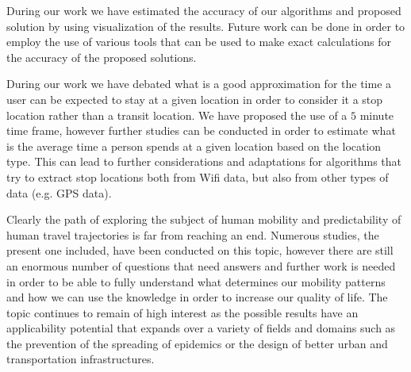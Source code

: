 During our work we have estimated the accuracy of our algorithms and proposed
solution by using visualization of the results. Future work can be done in order
to employ the use of various tools that can be used to make exact calculations
for the accuracy of the proposed solutions.

During our work we have debated what is a good approximation for the time a user
can be expected to stay at a given location in order to consider it a stop
location rather than a transit location. We have proposed the use of a $5$
minute time frame, however further studies can be conducted in order to estimate
what is the average time a person spends at a given location based on the
location type. This can lead to further considerations and adaptations for
algorithms that try to extract stop locations both from Wifi data, but also from
other types of data (e.g. GPS data).

Clearly the path of exploring the subject of human mobility and predictability
of human travel trajectories is far from reaching an end. Numerous studies, the
present one included, have been conducted on this topic, however there are
still an enormous number of questions that need answers and further work is
needed in order to be able to fully understand what determines our mobility
patterns and how we can use the knowledge in order to increase our quality of
life. The topic continues to remain of high interest as the possible results have an
applicability potential that expands over a variety of fields and domains such
as the prevention of the spreading of epidemics or the design of better urban
and transportation infrastructures.
